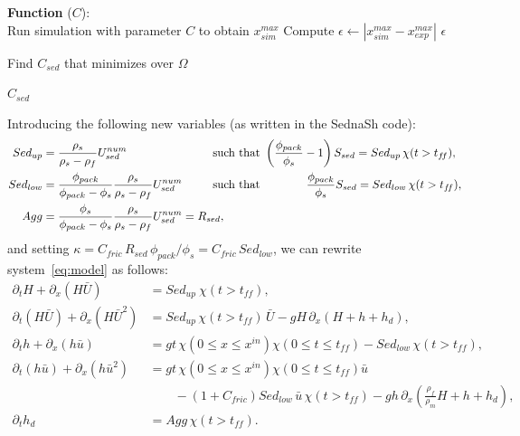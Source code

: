 \begin{algorithm}[H]
    \caption{Optimization of the $C_{sed}$ parameter}
    \label{algo:calib_final}



    \BlankLine
    \textbf{Function} ($C$):\\
    \Indp
        Run simulation with parameter $C$ to obtain $x_{sim}^{max}$\;
        Compute $\epsilon \leftarrow |x_{sim}^{max} - x_{exp}^{max}|$\;
        \Return $\epsilon$\;
    \Indm

    \BlankLine
    Find $C_{sed}$ that minimizes  over $\Omega$\;

    \Return $C_{sed}$\;
\end{algorithm}


Introducing the following new variables (as written in the SednaSh code):
\begin{align*}
    Sed_{up} &= \frac{\rho_s}{\rho_s - \rho_f} U_{sed}^{num} & &\mbox{\hspace{-0.8cm} such that } \left( \frac{\phi_{pack}}{\phi_s} - 1 \right) S_{sed}= Sed_{up} \, \chi(t > t_{f\!f}), \\
    Sed_{low} &= \frac{\phi_{pack}}{\phi_{pack} - \phi_{s}} \frac{\rho_s}{\rho_s - \rho_f} U_{sed}^{num} & &\mbox{\hspace{-0.8cm} such that } \qquad \ \  \quad\frac{\phi_{pack}}{\phi_s} S_{sed}= Sed_{low} \, \chi(t > t_{f\!f}), \\
    Agg &= \frac{\phi_{s}}{\phi_{pack} - \phi_{s}} \frac{\rho_s}{\rho_s - \rho_f} U_{sed}^{num} = R_{sed},& &
\end{align*}
and setting $\kappa = C_{fric} \, R_{sed} \,  \phi_{pack}/\phi_s = C_{fric} \, Sed_{low}$,
we can rewrite system~\eqref{eq:model} as follows:
\begin{subequations} \label{eq:model_newvars}
\begin{align*}
\partial_t H + \partial_x(H\bar{U})
&= Sed_{up} \ \chi(t > t_{f\!f}),
\\[1em]
\partial_t(H\bar{U}) + \partial_x(H\bar{U}^2)
&= Sed_{up} \, \chi(t > t_{f\!f}) \, \bar{U}
- g H \, \partial_x(H + h + h_d),
\\[1em]
\partial_t h + \partial_x(h\bar{u})
&= gt\, \chi( 0 \leq x \leq x^{in})\chi( 0 \leq t \leq t_{f\!f}) - Sed_{low} \, \chi(t > t_{f\!f}),
\\[1em]
\partial_t(h\bar{u}) + \partial_x(h\bar{u}^2)
&= gt\, \chi( 0 \leq x \leq x^{in})\chi( 0 \leq t \leq t_{f\!f}) \bar{u} \\
& \qquad- \left(1 + C_{fric}\right)Sed_{low} \, \bar{u} \, \chi(t > t_{f\!f}) - g h \, \partial_x \left( \frac{\rho_f}{\rho_m} H + h + h_d \right),
\\
\partial_t h_d &= Agg \, \chi(t > t_{f\!f}).
\end{align*}
\end{subequations}


